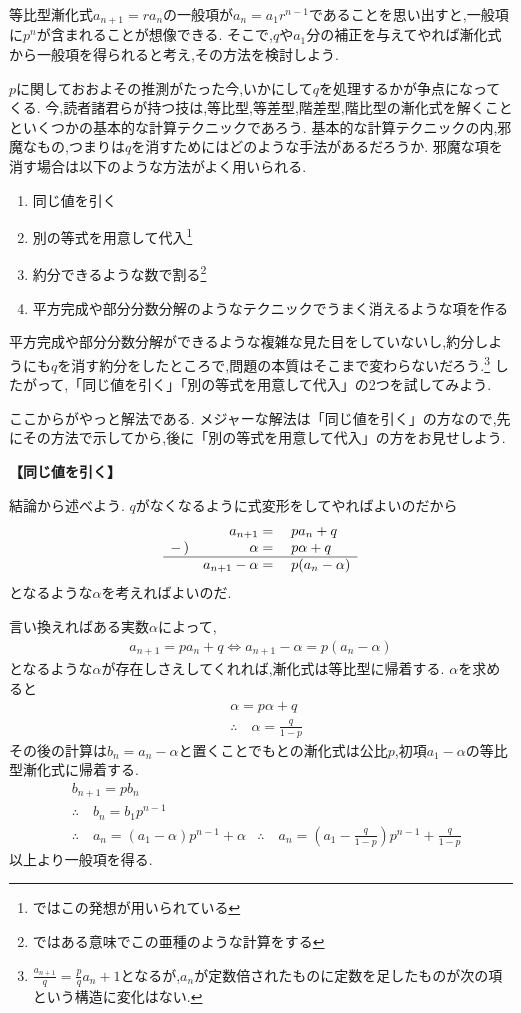  等比型漸化式$a_{n+1}=ra_n$の一般項が$a_n=a_1r^{n-1}$であることを思い出すと,一般項に$p^n$が含まれることが想像できる.
  そこで,$q$や$a_1$分の補正を与えてやれば漸化式から一般項を得られると考え,その方法を検討しよう.
  
  $p$に関しておおよその推測がたった今,いかにして$q$を処理するかが争点になってくる.
  今,読者諸君らが持つ技は,等比型,等差型,階差型,階比型の漸化式を解くことといくつかの基本的な計算テクニックであろう.
  基本的な計算テクニックの内,邪魔なもの,つまりは$q$を消すためにはどのような手法があるだろうか.
  邪魔な項を消す場合は以下のような方法がよく用いられる.
  \begin{enumerate}
    \item 同じ値を引く
    \item 別の等式を用意して代入\footnote{ではこの発想が用いられている}
    \item 約分できるような数で割る\footnote{ではある意味でこの亜種のような計算をする}
    \item 平方完成や部分分数分解のようなテクニックでうまく消えるような項を作る
  \end{enumerate}
  平方完成や部分分数分解ができるような複雑な見た目をしていないし,約分しようにも$q$を消す約分をしたところで,問題の本質はそこまで変わらないだろう.\footnote{$\frac{a_{n+1}}{q}=\frac{p}{q}a_{n}+1$となるが,$a_n$が定数倍されたものに定数を足したものが次の項という構造に変化はない.}
  したがって,「同じ値を引く」「別の等式を用意して代入」の2つを試してみよう.
  
  ここからがやっと解法である.
  メジャーな解法は「同じ値を引く」の方なので,先にその方法で示してから,後に「別の等式を用意して代入」の方をお見せしよう.

  \noindent \textbf{【同じ値を引く】}
  
  結論から述べよう.
  $q$がなくなるように式変形をしてやればよいのだから
  \[
    \begin{array}{rrl}
      &a_{n+1}={}&pa_n+q\\
      -\,)&\alpha={}&p\alpha+q\\ \hline
      &a_{n+1}-\alpha={}&p(a_n-\alpha)
    \end{array}
  \]
  となるような$\alpha$を考えればよいのだ.
  
  言い換えればある実数$\alpha$によって,
  \begin{align*}
    a_{n+1}=pa_n+q \iff a_{n+1}-\alpha=p(a_n-\alpha)
  \end{align*}
  となるような$\alpha$が存在しさえしてくれれば,漸化式は等比型に帰着する.
  $\alpha$を求めると
  \begin{align*}
    &\alpha=p\alpha+q\\
    &\therefore \quad \alpha=\frac{q}{1-p}
  \end{align*}
  その後の計算は$b_n=a_n-\alpha$と置くことでもとの漸化式は公比$p$,初項$a_1-\alpha$の等比型漸化式に帰着する.
  \begin{align*}
    &b_{n+1}=pb_n\\
    &\therefore \quad b_n=b_1p^{n-1}\\
    &\therefore \quad a_n=(a_1-\alpha)p^{n-1}+\alpha
    &\therefore \quad a_n=(a_1-\frac{q}{1-p})p^{n-1}+\frac{q}{1-p}
  \end{align*}
  以上より一般項を得る.
  
